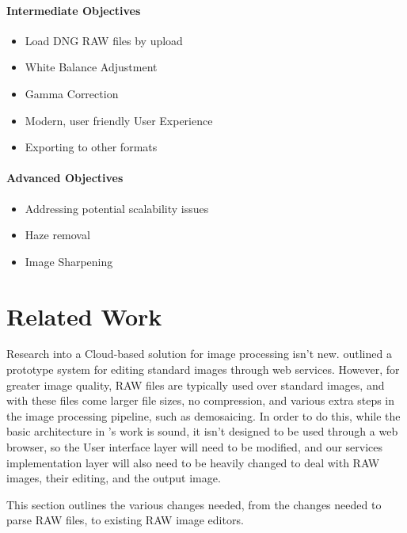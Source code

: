 \documentclass[11pt,a4paper]{article}
\begin{document}
\paragraph{Intermediate Objectives}
    \begin{itemize}
      \item Load DNG RAW files by upload
      \item White Balance Adjustment
      \item Gamma Correction
      \item Modern, user friendly User Experience
      \item Exporting to other formats
    \end{itemize}
\paragraph{Advanced Objectives}
    \begin{itemize}
      \item Addressing potential scalability issues
      \item Haze removal
      \item Image Sharpening
    \end{itemize}
\section{Related Work}
Research into a Cloud-based solution for image processing isn't new. \cite{WebServiceImageProcessing} outlined a prototype
system for editing standard images through web services. However, for greater image quality, RAW files are typically used
over standard images, and with these files come larger file sizes, no compression, and various extra steps in the image processing
pipeline, such as demosaicing. In order to do this, while the basic architecture in 's work is sound,
it isn't designed to be used through a web browser, so the User interface layer will need to be modified, and our services implementation layer
will also need to be heavily changed to deal with RAW images, their editing, and the output image.

This section outlines the various changes needed, from the changes needed to parse RAW files, to existing RAW image editors.
\end{document}
